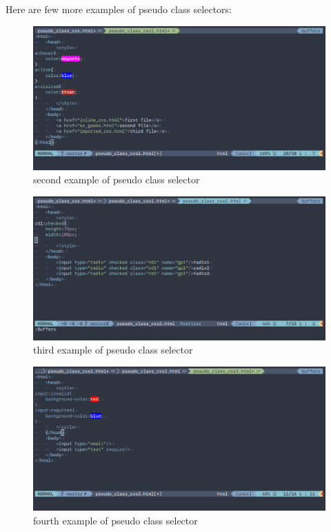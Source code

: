 \documentclass[a4paper,1pt,oneside]{article}
\begin{document}
\vskip 1cm

Here are few more examples of pseudo class selectors:

\begin{figure}[hbt!]
	\centering
	\includegraphics[width=1\textwidth]{images/2020-03-23-231213_996x491_scrot.png}
	\caption{second example of pseudo class selector}
\end{figure}

\begin{figure}[hbt!]
	\centering
	\includegraphics[width=1\textwidth]{images/2020-03-23-231849_996x491_scrot.png}
	\caption{third example of pseudo class selector}
\end{figure}

\begin{figure}[hbt!]
	\centering
	\includegraphics[width=1\textwidth]{images/2020-03-23-232050_996x491_scrot.png}
	\caption{fourth example of pseudo class selector}
\end{figure}
\end{document}
